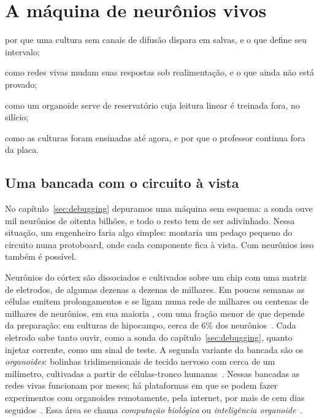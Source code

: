 \chapter{A máquina de neurônios vivos}
\label{sec:livingmachine}
\begin{chaptergoals}
\item por que uma cultura sem canais de difusão dispara em salvas, e o que define seu intervalo;
\item como redes vivas mudam suas respostas sob realimentação, e o que ainda não está provado;
\item como um organoide serve de reservatório cuja leitura linear é treinada fora, no silício;
\item como as culturas foram ensinadas até agora, e por que o professor continua fora da placa.
\end{chaptergoals}

\section{Uma bancada com o circuito à vista}

No capítulo~\ref{sec:debugging} depuramos uma máquina sem esquema: a sonda ouve mil neurônios de oitenta bilhões, e todo o resto tem de ser adivinhado. Nessa situação, um engenheiro faria algo simples: montaria um pedaço pequeno do circuito numa protoboard, onde cada componente fica à vista. Com neurônios isso também é possível.

Neurônios do córtex são dissociados e cultivados sobre um chip com uma matriz de eletrodos, de algumas dezenas a dezenas de milhares. Em poucas semanas as células emitem prolongamentos e se ligam numa rede de milhares ou centenas de milhares de neurônios, em sua maioria , com uma fração menor de  que depende da preparação: em culturas de hipocampo, cerca de $6\%$ dos neurônios~\cite{Benson1994}. Cada eletrodo sabe tanto ouvir, como a sonda do capítulo~\ref{sec:debugging}, quanto injetar corrente, como um sinal de teste. A segunda variante da bancada são os \emph{organoides}: bolinhas tridimensionais de tecido nervoso com cerca de um milímetro, cultivadas a partir de células-tronco humanas~\cite{Lancaster2013}. Nessas bancadas as redes vivas funcionam por meses; há plataformas em que se podem fazer experimentos com organoides remotamente, pela internet, por mais de cem dias seguidos~\cite{Jordan2024}. Essa área se chama \emph{computação biológica} ou \emph{inteligência organoide}~\cite{Smirnova2023}.

